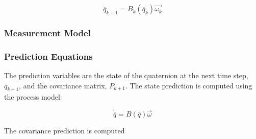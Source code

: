 \documentclass{article}
\begin{document}
\begin{flushleft}
\[ \overline{q}_{k+1} = B_k(\overline{q}_k) \vec{\omega_k} \]

\subsubsection{Measurement Model}

\subsubsection{Prediction Equations}

The prediction variables are the state of the quaternion at the next time step, $\overline{q}_{k+1}$, and the covariance matrix, $\overline{P}_{k+1}$. The state prediction is computed using the process model: 

\[ \dot{\overline{q}} = B(\overline{q}) \vec{\omega} \]

The covariance prediction is computed 






\end{flushleft}
\end{document}
